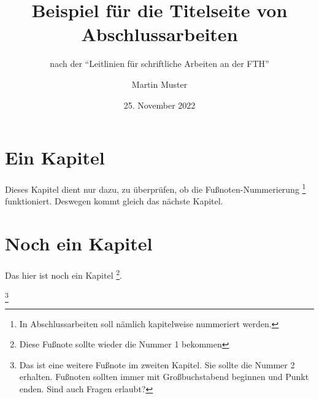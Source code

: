 \documentclass{scrreport}
\begin{document}
\title{Beispiel für die Titelseite von Abschlussarbeiten}
\subtitle{nach der \enquote{Leitlinien für schriftliche Arbeiten an der FTH}}
\author{Martin Muster}
\date{25. November 2022}

\maketitle

\chapter{Ein Kapitel}
Dieses Kapitel dient nur dazu, zu überprüfen, ob die Fußnoten-Nummerierung \footnote{In Abschlussarbeiten soll nämlich kapitelweise nummeriert werden.} funktioniert. Deswegen kommt gleich das nächste Kapitel.

\chapter{Noch ein Kapitel}
Das hier ist noch ein Kapitel \footnote{Diese Fußnote sollte wieder die Nummer 1 bekommen}.

\lipsum \footnote{Das ist eine weitere Fußnote im zweiten Kapitel. Sie sollte die Nummer 2 erhalten. Fußnoten sollten immer mit Großbuchstabend beginnen und Punkt enden. Sind auch Fragen erlaubt?}
\end{document}
